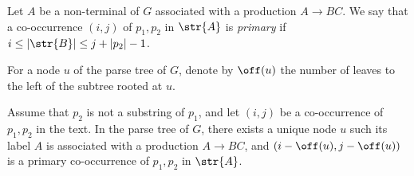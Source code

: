 \begin{definition}
Let $A$ be a non-terminal of $G$ associated with a production $A \rightarrow BC$. We say that a co-occurrence $(i,j)$ of $p_1, p_2$ in $\str{A}$ is \emph{primary} if $i \le |\str{B}| \le j + |p_2|-1$.   
\end{definition}

For a node $u$ of the parse tree of $G$, denote by $\off(u)$ the number of leaves to the left of the subtree rooted at $u$.

\begin{observation}
\label{obs:primarycoocc}
Assume that $p_2$ is not a substring of $p_1$, and let $(i,j)$ be a co-occurrence of $p_1,p_2$ in the text. In the parse tree of $G$, there exists a unique node $u$ such its label $A$ is associated with a production $A \rightarrow BC$, and $(i-\off(u),j-\off(u))$ is a primary co-occurrence of $p_1,p_2$ in $\str{A}$.
\end{observation}
       
